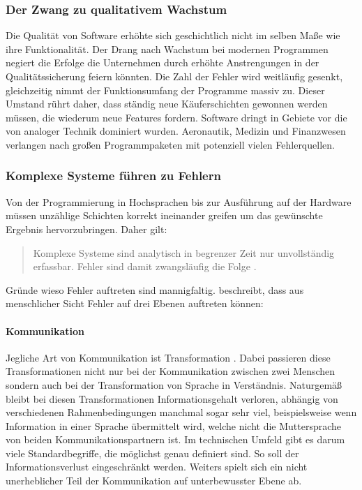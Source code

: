 \subsubsection{Der Zwang zu qualitativem Wachstum}
Die Qualität von Software erhöhte sich geschichtlich nicht im selben Maße wie ihre Funktionalität. Der Drang nach Wachstum bei modernen Programmen negiert die Erfolge die Unternehmen durch erhöhte Anstrengungen in der Qualitätssicherung feiern könnten. Die Zahl der Fehler wird weitläufig gesenkt,  gleichzeitig nimmt der Funktionsumfang der Programme massiv zu. Dieser Umstand rührt daher, dass ständig neue Käuferschichten gewonnen werden müssen, die wiederum neue Features fordern.
Software dringt in Gebiete vor die von analoger Technik dominiert wurden. Aeronautik, Medizin und Finanzwesen verlangen nach großen Programmpaketen mit potenziell vielen Fehlerquellen.

\subsubsection{Komplexe Systeme führen zu Fehlern}
Von der Programmierung in Hochsprachen bis zur Ausführung auf der Hardware müssen unzählige Schichten korrekt ineinander greifen um das gewünschte Ergebnis hervorzubringen. 
Daher gilt:

\begin{quote}
Komplexe Systeme sind analytisch in begrenzer Zeit nur unvollständig erfassbar. Fehler sind damit zwangsläufig die Folge \cite{vigenschow_objektorientiertes_2004}.
\end{quote}

Gründe wieso Fehler auftreten sind mannigfaltig. \citeauthor{vigenschow_objektorientiertes_2004} beschreibt, dass aus menschlicher Sicht Fehler auf drei Ebenen auftreten können\cite{vigenschow_objektorientiertes_2004}:

\paragraph{Kommunikation}
Jegliche Art von Kommunikation ist Transformation \cite{shannon_mathematische_1976}. Dabei passieren diese Transformationen nicht nur bei der Kommunikation zwischen zwei Menschen sondern auch bei der Transformation von Sprache in Verständnis. Naturgemäß bleibt bei diesen Transformationen Informationsgehalt verloren, abhängig von verschiedenen Rahmenbedingungen manchmal sogar sehr viel, beispielsweise wenn Information in einer Sprache übermittelt wird, welche nicht die Muttersprache von beiden Kommunikationspartnern ist.
Im technischen Umfeld gibt es darum viele Standardbegriffe, die möglichst genau definiert sind. So soll der Informationsverlust eingeschränkt werden.
Weiters spielt sich ein nicht unerheblicher Teil der Kommunikation auf unterbewusster Ebene ab.

